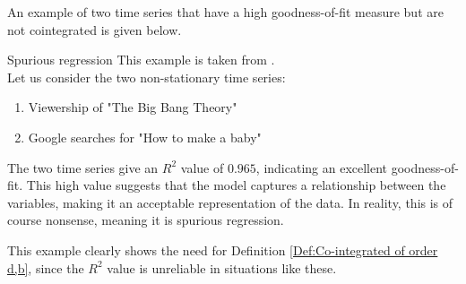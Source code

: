 

\noindent An example of two time series that have a high goodness-of-fit measure but are not cointegrated is given below. 
\begin{ekse}{Spurious regression}
This example is taken from \cite{Spurious_example}.\\
    Let us consider the two non-stationary time series:
    \begin{enumerate}
        \item Viewership of "The Big Bang Theory"
        \item Google searches for "How to make a baby"
    \end{enumerate}
  The two time series give an $R^2$ value of $0.965$, indicating an excellent goodness-of-fit. This high value suggests that the model captures a relationship between the variables, making it an acceptable representation of the data. In reality, this is of course nonsense, meaning it is spurious regression.
\end{ekse}
\noindent This example clearly shows the need for Definition \ref{Def:Co-integrated of order d,b}, since the $R^2$ value is unreliable in situations like these.
\begin{comment}
\begin{defi}{Error Correction}
    A vector time series $x_t$ can be expressed using error correction if it can be written as:
    \begin{align*}
        A(B)(1-B)x_t=-\gamma z_{t_{t-1}}+u_t
    \end{align*}
    where $u_t$ is a stationary multivariate disturbance, $A(0)=I$, $A(1)$ has all elements finite, $z_\tau=\alpha^Tx_\tau$ and $\gamma\neq0$.
\end{defi}
Definition from \cite{co-Integration_and_error_correction}
The error correction model is a tool used when 
\end{comment}

